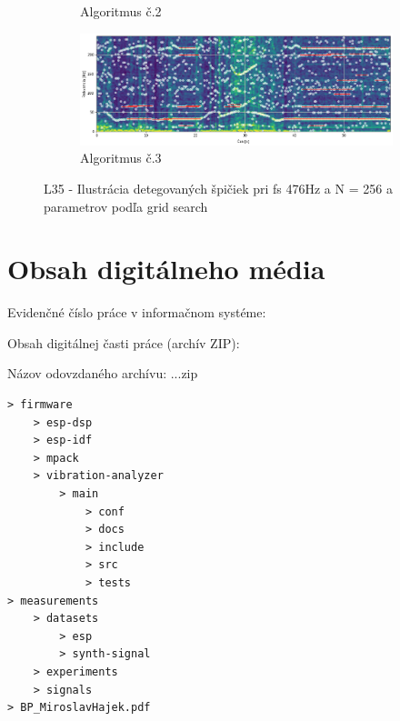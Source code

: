 \begin{figure}[h]
\begin{subfigure}{\textwidth}
        \caption{Algoritmus č.2}
     \end{subfigure}
      \begin{subfigure}{\textwidth}
    	\centering
        \includegraphics[width=\textwidth]{figures/verification/L35-dataset-A3.png}
        \caption{Algoritmus č.3}
     \end{subfigure}
     \caption{L35 - Ilustrácia detegovaných špičiek pri fs 476Hz a N = 256 a parametrov podľa grid search}
\end{figure}

\chapter{Obsah digitálneho média}
\renewcommand*{\thepage}{E-\arabic{page}}
\par Evidenčné číslo práce v informačnom systéme: \RegNo
\par Obsah digitálnej časti práce (archív ZIP):
\par Názov odovzdaného archívu: ...zip
\begin{verbatim}
> firmware
    > esp-dsp
	> esp-idf
	> mpack
	> vibration-analyzer
		> main
			> conf
			> docs
			> include
			> src
			> tests
> measurements
	> datasets
		> esp
		> synth-signal
	> experiments
	> signals
> BP_MiroslavHajek.pdf
\end{verbatim}


